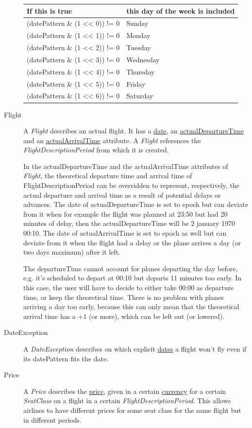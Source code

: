 \documentclass[a4paper,11pt]{article}
\newcommand{\npar}{\par \vspace{2.3ex plus 0.3ex minus 0.3ex} \noindent}
\newcommand{\dsltype}[1]{\textit{#1}}
\newcommand{\dslattr}[1]{\uline{#1}}
\begin{document}
\begin{description}
\begin{center}
\begin{tabular}{l|l}
If this is true & this day of the week is included \\
\hline
(datePattern \& (1 << 0)) != 0 & Sunday \\
(datePattern \& (1 << 1)) != 0 & Monday \\
(datePattern \& (1 << 2)) != 0 & Tuesday \\
(datePattern \& (1 << 3)) != 0 & Wednesday \\
(datePattern \& (1 << 4)) != 0 & Thursday \\
(datePattern \& (1 << 5)) != 0 & Friday \\
(datePattern \& (1 << 6)) != 0 & Saturday \\
\end{tabular}
\end{center}

\item[Flight]
A \dsltype{Flight} describes an actual flight. It has a \dslattr{date}, an \dslattr{actualDepartureTime} and an \dslattr{actualArrivalTime} attribute. A \dsltype{Flight} references the \dsltype{FlightDescriptionPeriod} from which it is created.

\npar In the actualDepartureTime and the actualArrivalTime attributes of \dsltype{Flight}, the theoretical departure time and arrival time of FlightDescriptionPeriod can be overridden to represent, respectively, the actual departure and arrival time as a result of potential delays or advances. The date of actualDepartureTime is set to epoch but can deviate from it when for example the flight was planned at 23:50 but had 20 minutes of delay, then the actualDepartureTime will be 2 january 1970 00:10. The date of actualArrivalTime is set to epoch as well but can deviate from it when the flight had a delay or the plane arrives a day (or two days maximum) after it left.
\par The departureTime cannot account for planes departing the day before, e.g. it's scheduled to depart at 00:10 but departs 11 minutes too early. In this case, the user will have to decide to either take 00:00 as departure time, or keep the theoretical time. There is no problem with planes arriving a day too early, because this can only mean that the theoretical arrival time has a +1 (or more), which can be left out (or lowered).

\item[DateException]
A \dsltype{DateException} describes on which explicit \dslattr{dates} a flight won’t fly even if its datePattern fits the date.

\item[Price]
A \dsltype{Price} describes the \dslattr{price}, given in a certain \dslattr{currency} for a certain \dsltype{SeatClass} on a flight in a certain \dsltype{FlightDescriptionPeriod}. This allows airlines to have different prices for some seat class for the same flight but in different periods.

\end{description}
\end{document}
